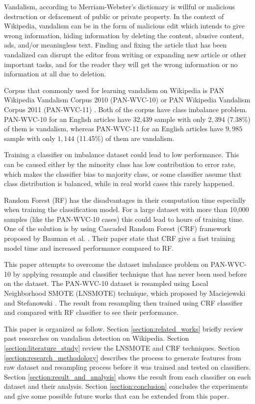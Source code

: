Vandalism, according to Merriam-Webster's dictionary is willful or malicious
destruction or defacement of public or private property.
In the context of Wikipedia, vandalism can be in the form of malicious edit
which intends to give wrong information, hiding information by deleting
the content, abusive content, ads, and/or meaningless text.
Finding and fixing the article that has been vandalized can disrupt the editor
from writing or expanding new article or other important tasks, and for the
reader they will get the wrong information or no information at all due to
deletion.

Corpus that commonly used for learning vandalism on Wikipedia is PAN Wikipedia
Vandalism Corpus 2010 (PAN-WVC-10)
\cite{potthast:2010b}
or PAN Wikipedia Vandalism Corpus 2011 (PAN-WVC-11)
\cite{potthast:2010b}.
Both of the corpus have class imbalance problem.
PAN-WVC-10 for an English articles have 32,439 sample with only $2,394$ (7.38\%)
of them is vandalism, whereas PAN-WVC-11 for an English articles have $9,985$
sample with only $1,144$ (11.45\%) of them are vandalism.

Training a classifier on imbalance dataset could lead to low performance.
This can be caused either by the minority class has low contribution to error
rate, which makes the classifier bias to majority class, or some classifier
assume that class distribution is balanced, while in real world cases this
rarely happened.

Random Forest (RF) has the disadvantages in their computation time
especially when training the classification model.  For a large dataset with
more than 10,000 samples (like the PAN-WVC-10 cases) this could lead to hours
of training time.  One of the solution is by using Cascaded Random Forest (CRF)
framework proposed by Bauman et al. \cite{baumann2013cascaded}.
Their paper state that CRF give a fast training model time and increased
performance compared to RF.

This paper attempts to overcome the dataset imbalance problem on PAN-WVC-10 by
applying resample and classifier technique that has never been used before on
the dataset.
The PAN-WVC-10 dataset is resampled using Local Neighborhood SMOTE (LNSMOTE)
technique,
which proposed by Maciejewski and Stefanowski
\cite{maciejewski2011local}.
The result from resampling then trained using CRF classifier and compared with
RF classifier to see their performance.

This paper is organized as follow.
Section \ref{section:related_works} briefly review past researches on vandalism
detection on Wikipedia.
Section \ref{section:literature_study} review the LNSMOTE and CRF techniques.
Section \ref{section:research_methodology} describes the process to generate
features from raw dataset and resampling process before it was trained and
tested on classifiers.
Section \ref{section:result_and_analysis} shows the result from each classifier
on each dataset and their analysis.
Section \ref{section:conclusion} concludes the experiments and
give some possible future works that can be extended from this paper.

\IEEEpubidadjcol
